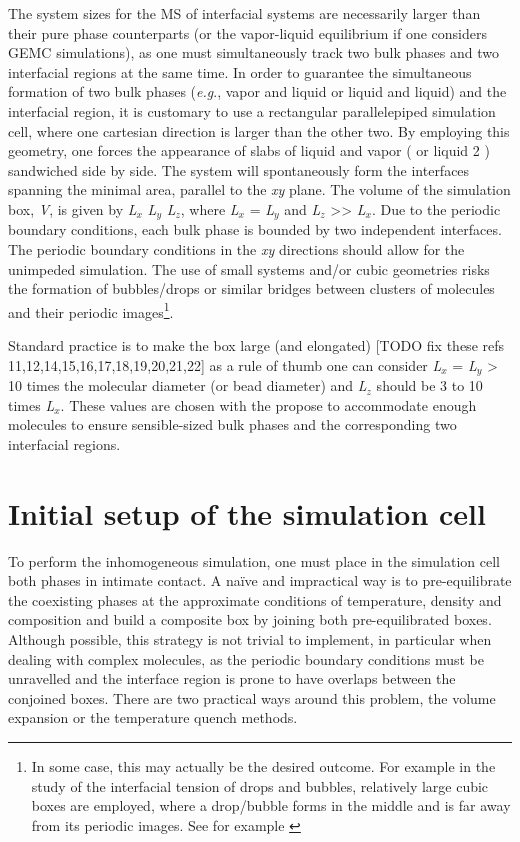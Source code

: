 \documentclass{scrbook}
\begin{document}
The system sizes for the MS of interfacial systems are necessarily larger than
their pure phase counterparts (or the vapor-liquid equilibrium if one considers
GEMC simulations), as one must simultaneously track two bulk phases and two
interfacial regions at the same time. In order to guarantee the simultaneous
formation of two bulk phases (\textit{e.g}., vapor and liquid or liquid and
liquid) and the interfacial region, it is customary to use a rectangular
parallelepiped simulation cell, where one cartesian direction is larger than
the other two. By employing this geometry, one forces the appearance of slabs
of liquid and vapor ( or liquid 2 ) sandwiched side by side. The system will
spontaneously form the interfaces spanning the minimal area, parallel to the
\textit{xy} plane. The volume of the simulation box, \textit{V}, is given by
\textit{L}$_{x}$ \textit{L}$_{y}$ \textit{L}$_{z}$, where \textit{L}$_{x}$
= \textit{L}$_{y}$ and \textit{L}$_{z}$ {\textgreater}{\textgreater}
\textit{L}$_{x}$. Due to the periodic boundary conditions, each bulk phase is
bounded by two independent interfaces. The periodic boundary conditions in the
\textit{xy} directions should allow for the unimpeded simulation. The use of
small systems and/or cubic geometries risks the formation of bubbles/drops or
similar bridges between clusters of molecules and their periodic
images\footnote{In some case, this may actually be the desired outcome.
For example in the study of the interfacial tension of drops and bubbles,
relatively large cubic boxes are employed, where a drop/bubble forms in the
middle and is far away from its periodic images. See for example \citep{lau2015}}.

Standard practice is to make the box large (and elongated)
[TODO fix these refs 11,12,14,15,16,17,18,19,20,21,22] as a rule of thumb one can consider
\textit{L}$_{x}$ = \textit{L}$_{y}$ {\textgreater} 10 times the molecular
diameter (or bead diameter) and \textit{L}$_{z}$ should be 3 to 10 times
\textit{L}$_{x}$. These values are chosen with the propose to accommodate
enough molecules to ensure sensible-sized bulk phases and the corresponding two
interfacial regions. 

\section{Initial setup of the simulation cell}

To perform the inhomogeneous simulation, one must place in the simulation cell
both phases in intimate contact. A na\"{i}ve and impractical way is to
pre-equilibrate the coexisting phases at the approximate conditions of
temperature, density and composition and build a composite box by joining both
pre-equilibrated boxes. Although possible, this strategy is not trivial to
implement, in particular when dealing with complex molecules, as the periodic
boundary conditions must be unravelled and the interface region is prone to
have overlaps between the conjoined boxes. There are two practical ways around
this problem, the volume expansion or the temperature quench methods. 
\end{document}
